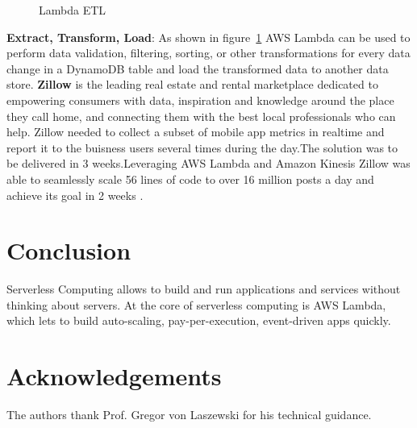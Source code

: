 \documentclass[9pt,twocolumn,twoside]{../../styles/osajnl}
\begin{document}
\begin{figure}[H]
\centering
\graphicspath{ {images/} }
\caption{Lambda ETL} \cite{www-AWSLambda}
\label{fig:usecase2}
\end{figure}

\textbf{Extract, Transform, Load}: As shown in figure~\ref{fig:usecase2} AWS Lambda can be used 
to perform data validation, filtering, sorting, or other transformations for 
every data change in a DynamoDB table and load the transformed data to another 
data store. \textbf{Zillow} is the leading real estate and rental marketplace 
dedicated to empowering consumers with data, inspiration and knowledge around 
the place they call home, and connecting them with the best local professionals 
who can help. Zillow needed to collect a subset of mobile app metrics in 
realtime and report it to the buisness users several times during the day.The 
solution was to be delivered in 3 weeks.Leveraging AWS Lambda and Amazon 
Kinesis Zillow was able to seamlessly scale 56 lines of code to over 16 million 
posts a day and achieve its goal in 2 weeks \cite{www-AWSLambdaZillow}.


\section{Conclusion}
Serverless Computing allows to build and run applications and services without 
thinking about servers. At the core of serverless computing is AWS Lambda, 
which lets to build auto-scaling, pay-per-execution, event-driven apps quickly.

\section*{Acknowledgements}

The authors thank Prof. Gregor von Laszewski for his technical guidance.


\end{document}
